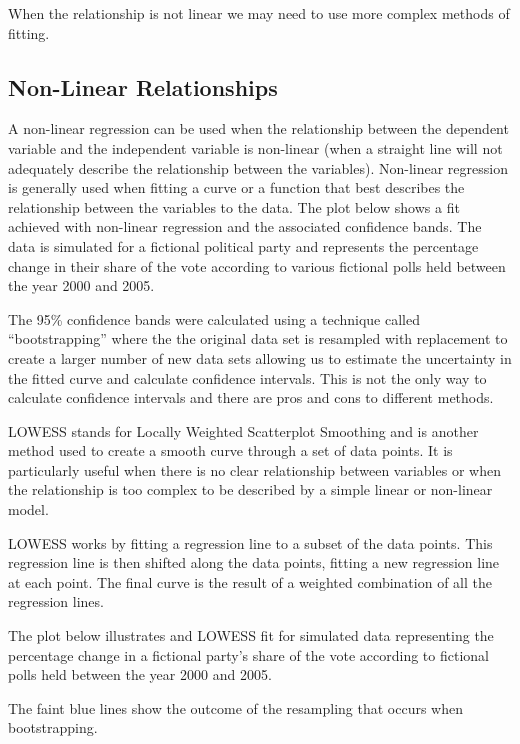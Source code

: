\documentclass[
]{book}
\begin{document}
When the relationship is not linear we may need to use more complex methods of fitting.

\hypertarget{non-linear-relationships}{%
\subsection{Non-Linear Relationships}\label{non-linear-relationships}}

A non-linear regression can be used when the relationship between the dependent variable and the independent variable is non-linear (when a straight line will not adequately describe the relationship between the variables). Non-linear regression is generally used when fitting a curve or a function that best describes the relationship between the variables to the data. The plot below shows a fit achieved with non-linear regression and the associated confidence bands. The data is simulated for a fictional political party and represents the percentage change in their share of the vote according to various fictional polls held between the year 2000 and 2005.

The 95\% confidence bands were calculated using a technique called ``bootstrapping'' where the the original data set is resampled with replacement to create a larger number of new data sets allowing us to estimate the uncertainty in the fitted curve and calculate confidence intervals. This is not the only way to calculate confidence intervals and there are pros and cons to different methods.

LOWESS stands for Locally Weighted Scatterplot Smoothing and is another method used to create a smooth curve through a set of data points. It is particularly useful when there is no clear relationship between variables or when the relationship is too complex to be described by a simple linear or non-linear model.

LOWESS works by fitting a regression line to a subset of the data points. This regression line is then shifted along the data points, fitting a new regression line at each point. The final curve is the result of a weighted combination of all the regression lines.

The plot below illustrates and LOWESS fit for simulated data representing the percentage change in a fictional party's share of the vote according to fictional polls held between the year 2000 and 2005.

The faint blue lines show the outcome of the resampling that occurs when bootstrapping.
\end{document}
